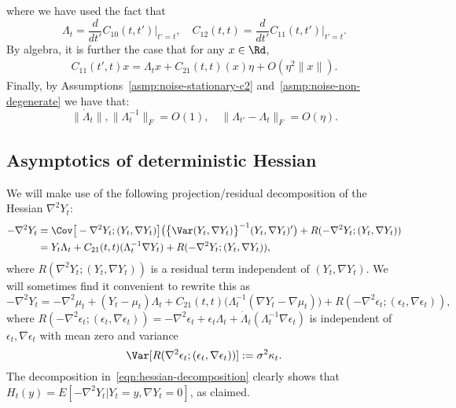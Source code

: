 \documentclass{article}
\begin{document}
	where we have used the fact that
	$$
	\Lambda_{t} = \frac{d}{dt'} C_{10}(t,t') \Big|_{t' = t}, \quad C_{12}(t,t) = \frac{d}{dt'} C_{11}(t,t')  \Big|_{t' = t}.
	$$ 
	By algebra, it is further the case that for any $x \in \Rd$,
	\begin{equation}
		\begin{aligned}
			\label{eqn:covariance-taylor-expansion-2}
			C_{11}(t',t)x = \Lambda_tx + C_{21}(t,t)(x)\eta + O(\eta^2\|x\|).
		\end{aligned}
	\end{equation}
	Finally, by Assumptions~\ref{asmp:noise-stationary-c2} and~\ref{asmp:noise-non-degenerate} we have that:
	\begin{equation}
		\label{eqn:variance-control}
		\|\dot{\Lambda}_t\|, \|\Lambda_{t}^{-1}\|_F = O(1), \quad \|\Lambda_{t'} - \Lambda_{t}\|_F = O(\eta).
	\end{equation}
	
	\subsection{Asymptotics of deterministic Hessian}
	\label{subsec:hessian-asymptotics}
	
		We will make use of the following projection/residual decomposition of the Hessian $\nabla^2 Y_t$:
	\begin{equation}
		\begin{aligned}
			-\nabla^2 Y_t 
			& = 
			\Cov\big[-\nabla^2 Y_t; (Y_t, \nabla Y_t)\big]\big(\big\{\Var(Y_t, \nabla Y_t)\big\}^{-1} (Y_t, \nabla Y_t)'\big) + R(-\nabla^2 Y_t; (Y_t, \nabla Y_t)) \\
			& = 
			Y_t \Lambda_t + C_{21}(t,t)(\Lambda_t^{-1} \nabla Y_t) + R(-\nabla^2 Y_t; (Y_t, \nabla Y_t)),
		\end{aligned}
	\end{equation}
	where $R(\nabla^2 Y_t; (Y_t, \nabla Y_t))$ is a residual term independent of $(Y_t, \nabla Y_t)$. We will sometimes find it convenient to rewrite this as
	\begin{equation}
		\label{eqn:hessian-decomposition}
		-\nabla^2 Y_t = -\nabla^2 \mu_t + (Y_t - \mu_t) \Lambda_t + C_{21}(t,t)\big(\Lambda_t^{-1} (\nabla Y_t - \nabla \mu_t)\big) + R(-\nabla^2 \epsilon_t; (\epsilon_t, \nabla \epsilon_t)),
	\end{equation}
	where $R(-\nabla^2 \epsilon_t; (\epsilon_t, \nabla \epsilon_t)) = -\nabla^2 \epsilon_t + \epsilon_t \Lambda_t + \dot{\Lambda}_t( \Lambda_t^{-1} \nabla \epsilon_t)$ is independent of $\epsilon_t,\nabla \epsilon_t$ with mean zero and variance
	\begin{equation}
		\label{eqn:hessian-decomposition-residual-variance}
		\Var[R(\nabla^2 \epsilon_t; (\epsilon_t, \nabla \epsilon_t))] := \sigma^2 \kappa_t.
	\end{equation} 
	The decomposition in~\eqref{eqn:hessian-decomposition} clearly shows that $H_t(y) = E[-\nabla^2 Y_t|Y_t = y,\nabla Y_t = 0]$, as claimed.
	
\end{document}
